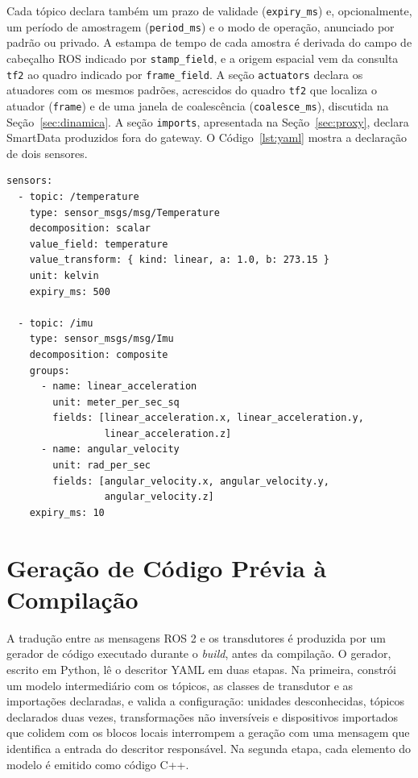 \documentclass[
    12pt,
    oneside,
    a4paper,
    chapter=TITLE,
    section=TITLE,
    english,
    brazil
]{abntex2}
\begin{document}
Cada tópico declara também um prazo de validade (\texttt{expiry\_ms}) e,
opcionalmente, um período de amostragem (\texttt{period\_ms}) e o modo de
operação, anunciado por padrão ou privado. A estampa de tempo de cada
amostra é derivada do campo de cabeçalho ROS indicado por
\texttt{stamp\_field}, e a origem espacial vem da consulta \texttt{tf2} ao
quadro indicado por \texttt{frame\_field}. A seção \texttt{actuators}
declara os atuadores com os mesmos padrões, acrescidos do quadro
\texttt{tf2} que localiza o atuador (\texttt{frame}) e de uma janela de
coalescência (\texttt{coalesce\_ms}), discutida na
Seção~\ref{sec:dinamica}. A seção \texttt{imports}, apresentada na
Seção~\ref{sec:proxy}, declara SmartData produzidos fora do gateway. O
Código~\ref{lst:yaml} mostra a declaração de dois sensores.

\begin{lstlisting}[caption={Declaração de sensores no descritor YAML},
label=lst:yaml]
sensors:
  - topic: /temperature
    type: sensor_msgs/msg/Temperature
    decomposition: scalar
    value_field: temperature
    value_transform: { kind: linear, a: 1.0, b: 273.15 }
    unit: kelvin
    expiry_ms: 500

  - topic: /imu
    type: sensor_msgs/msg/Imu
    decomposition: composite
    groups:
      - name: linear_acceleration
        unit: meter_per_sec_sq
        fields: [linear_acceleration.x, linear_acceleration.y,
                 linear_acceleration.z]
      - name: angular_velocity
        unit: rad_per_sec
        fields: [angular_velocity.x, angular_velocity.y,
                 angular_velocity.z]
    expiry_ms: 10
\end{lstlisting}

\section{Geração de Código Prévia à Compilação}
\label{sec:codegen}

A tradução entre as mensagens ROS 2 e os transdutores é produzida por um
gerador de código executado durante o \textit{build}, antes da
compilação. O gerador, escrito em
Python, lê o descritor YAML em duas etapas. Na primeira, constrói um
modelo intermediário com os tópicos, as classes de transdutor e as
importações declaradas, e valida a configuração: unidades desconhecidas,
tópicos declarados duas vezes,
transformações não inversíveis e dispositivos importados que colidem com
os blocos locais interrompem a geração com uma mensagem que identifica a
entrada do descritor responsável. Na segunda etapa, cada elemento do
modelo é emitido como código C++.
\end{document}
